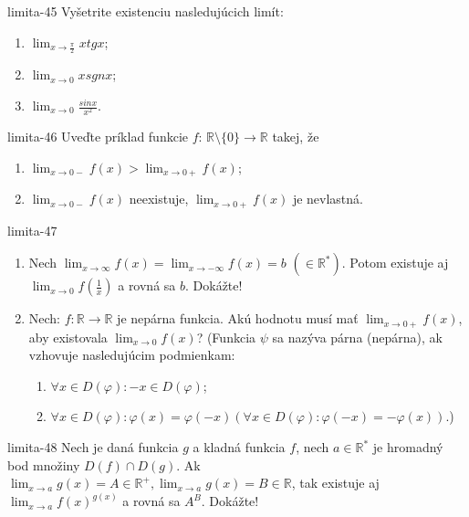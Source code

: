 \begin{defproblem}{limita-45}
Vyšetrite existenciu nasledujúcich limít:
\begin{enumerate}
\item $\lim_{x \rightarrow \frac{\pi}{2}} x tg x$;
\item $\lim_{x \rightarrow 0} x sgn x$;
\item $\lim_{x \rightarrow 0} \frac{sin x}{x^2}$.
\end{enumerate}
\end{defproblem}

\begin{defproblem}{limita-46}
Uveďte príklad funkcie $f$: $\mathbb{R} \setminus \{ 0\} \rightarrow \mathbb{R}$ takej, že 
\begin{enumerate}
\item $\lim_{x \rightarrow 0-} f(x)>\lim_{x \rightarrow 0+} f(x)$;
\item $\lim_{x \rightarrow 0-} f(x)$ neexistuje, $\lim_{x \rightarrow 0+} f(x)$ je nevlastná.
\end{enumerate}
\end{defproblem}

\begin{defproblem}{limita-47}
\begin{enumerate}
\item Nech $\lim_{x \rightarrow \infty} f(x)=\lim_{x \rightarrow -\infty} f(x)=b$  $(\in \mathbb{R^*})$. Potom existuje aj $\lim_{x \rightarrow 0} f(\frac{1}{x})$  a rovná sa $b$. Dokážte!
\item Nech: $f: \mathbb{R} \rightarrow \mathbb{R}$ je nepárna funkcia. Akú hodnotu musí mať $\lim_{x \rightarrow 0+} f(x)$, aby existovala $\lim_{x \rightarrow 0} f(x)$? (Funkcia $\psi$ sa nazýva párna (nepárna), ak vzhovuje nasledujúcim podmienkam:
\begin{enumerate}
\item $\forall x \in D(\varphi): -x \in D(\varphi)$;
\item $\forall x \in D(\varphi): \varphi(x)=\varphi(-x) (\forall x \in D(\varphi): \varphi(-x)=-\varphi(x))$.)
\end{enumerate}
\end{enumerate}
\end{defproblem}

\begin{defproblem}{limita-48}
Nech je daná funkcia $g$ a kladná funkcia $f$, nech $a \in \mathbb{R^*}$ je hromadný bod množiny $D(f)\cap D(g)$. Ak $\lim_{x \rightarrow a} g(x)=A \in \mathbb{R^+},\lim_{x \rightarrow a} g(x)=B \in \mathbb{R}$, tak existuje aj $\lim_{x \rightarrow a} f(x)^{g(x)}$ a rovná sa $A^B$. Dokážte!
\end{defproblem}

